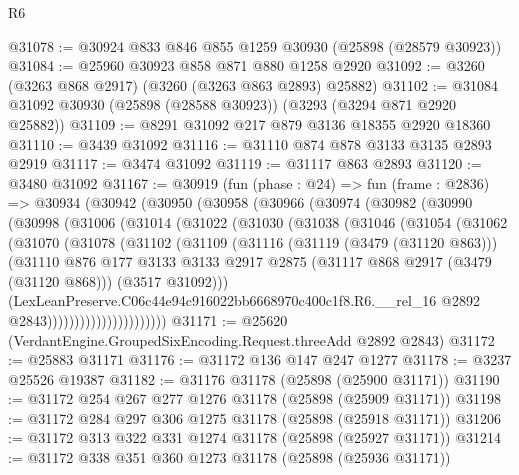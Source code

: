 \begin{lexlean}{R6}
\begin{coremodule}
@31078 := @30924 @833 @846 @855 @1259 @30930 (@25898 (@28579 @30923))
@31084 := @25960 @30923 @858 @871 @880 @1258 @2920
@31092 := @3260 (@3263 @868 @2917) (@3260 (@3263 @863 @2893) @25882)
@31102 := @31084 @31092 @30930 (@25898 (@28588 @30923)) (@3293 (@3294 @871 @2920 @25882))
@31109 := @8291 @31092 @217 @879 @3136 @18355 @2920 @18360
@31110 := @3439 @31092
@31116 := @31110 @874 @878 @3133 @3135 @2893 @2919
@31117 := @3474 @31092
@31119 := @31117 @863 @2893
@31120 := @3480 @31092
@31167 := @30919
    (fun (phase : @24) =>
    fun (frame : @2836) =>
    @30934
      (@30942
        (@30950
          (@30958
            (@30966
              (@30974
                (@30982
                  (@30990
                    (@30998
                      (@31006
                        (@31014
                          (@31022
                            (@31030
                              (@31038
                                (@31046
                                  (@31054
                                    (@31062
                                      (@31070
                                        (@31078
                                          (@31102
                                            (@31109
                                              (@31116
                                                (@31119 (@3479 (@31120 @863)))
                                                (@31110
                                                  @876
                                                  @177
                                                  @3133
                                                  @3133
                                                  @2917
                                                  @2875
                                                  (@31117 @868 @2917 (@3479 (@31120 @868)))
                                                  (@3517 @31092)))
                                              (LexLeanPreserve.C06c44e94c916022bb6668970c400c1f8.R6.__rel_16
                                                @2892
                                                @2843))))))))))))))))))))))
@31171 := @25620 (VerdantEngine.GroupedSixEncoding.Request.threeAdd @2892 @2843)
@31172 := @25883 @31171
@31176 := @31172 @136 @147 @247 @1277
@31178 := @3237 @25526 @19387
@31182 := @31176 @31178 (@25898 (@25900 @31171))
@31190 := @31172 @254 @267 @277 @1276 @31178 (@25898 (@25909 @31171))
@31198 := @31172 @284 @297 @306 @1275 @31178 (@25898 (@25918 @31171))
@31206 := @31172 @313 @322 @331 @1274 @31178 (@25898 (@25927 @31171))
@31214 := @31172 @338 @351 @360 @1273 @31178 (@25898 (@25936 @31171))

\end{coremodule}
\end{lexlean}

